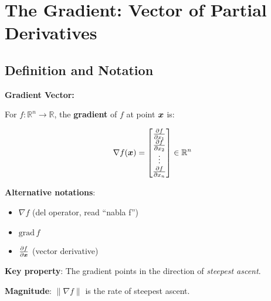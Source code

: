 \section{The Gradient: Vector of Partial Derivatives}

\subsection{Definition and Notation}

\begin{seanbox}{6.2}
\textbf{Gradient Vector:}

For $f: \mathbb{R}^n \to \mathbb{R}$, the \textbf{gradient} of $f$ at point $\bm{x}$ is:

\begin{equation}
    \nabla f(\bm{x}) = \begin{bmatrix}
        \frac{\partial f}{\partial x_1} \\
        \frac{\partial f}{\partial x_2} \\
        \vdots \\
        \frac{\partial f}{\partial x_n}
    \end{bmatrix} \in \mathbb{R}^n
\end{equation}

\textbf{Alternative notations}:
\begin{itemize}
    \item $\nabla f$ (del operator, read ``nabla f'')
    \item $\text{grad}\, f$
    \item $\frac{\partial f}{\partial \bm{x}}$ (vector derivative)
\end{itemize}

\textbf{Key property}: The gradient points in the direction of \textit{steepest ascent}.

\textbf{Magnitude}: $\|\nabla f\|$ is the rate of steepest ascent.
\end{seanbox}

